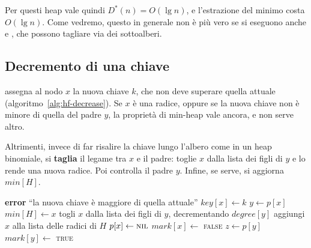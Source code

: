 Per questi heap vale quindi $D^*(n) = O(\lg n)$, e l'estrazione del minimo costa $O(\lg n)$. Come vedremo, questo in generale non è più vero se si eseguono anche \FibHeapDecreaseKey{} e \FibHeapDelete{}, che possono tagliare via dei sottoalberi.

\subsection{Decremento di una chiave}\label{sec:hf-decrease}
\FibHeapDecreaseKey{} assegna al nodo $x$ la nuova chiave $k$, che non deve superare quella attuale (algoritmo~\ref{alg:hf-decrease}). Se $x$ è una radice, oppure se la nuova chiave non è minore di quella del padre $y$, la proprietà di min-heap vale ancora, e non serve altro.

Altrimenti, invece di far risalire la chiave lungo l'albero come in un heap binomiale, si \textbf{taglia} il legame tra $x$ e il padre: \Cut{} toglie $x$ dalla lista dei figli di $y$ e lo rende una nuova radice. Poi \CascadingCut{} controlla il padre $y$. Infine, se serve, si aggiorna $\mathit{min}[H]$.

\begin{algorithm}[htbp]
\caption{Il decremento della chiave del nodo $x$: se la nuova chiave viola la proprietà di min-heap, $x$ viene tagliato dal padre.}\label{alg:hf-decrease}
\begin{algorithmic}[1]
    \State \textbf{error} ``la nuova chiave è maggiore di quella attuale''
  \EndIf
  \State $\mathit{key}[x] \gets k$
  \State $y \gets p[x]$
    \State {}
    \State {}
  \EndIf
    \State $\mathit{min}[H] \gets x$
  \EndIf
\EndProcedure
\Statex
{}
  \State togli $x$ dalla lista dei figli di $y$, decrementando $\mathit{degree}[y]$
  \State aggiungi $x$ alla lista delle radici di $H$
  \State $p[x] \gets \textsc{nil}$
  \State $\mathit{mark}[x] \gets$ \textsc{false}
\EndProcedure
\Statex
{}
  \State $z \gets p[y]$
      \State $\mathit{mark}[y] \gets$ \textsc{true}
    \Else
      \State {}
      \State {}
    \EndIf
  \EndIf
\EndProcedure
\end{algorithmic}
\end{algorithm}

